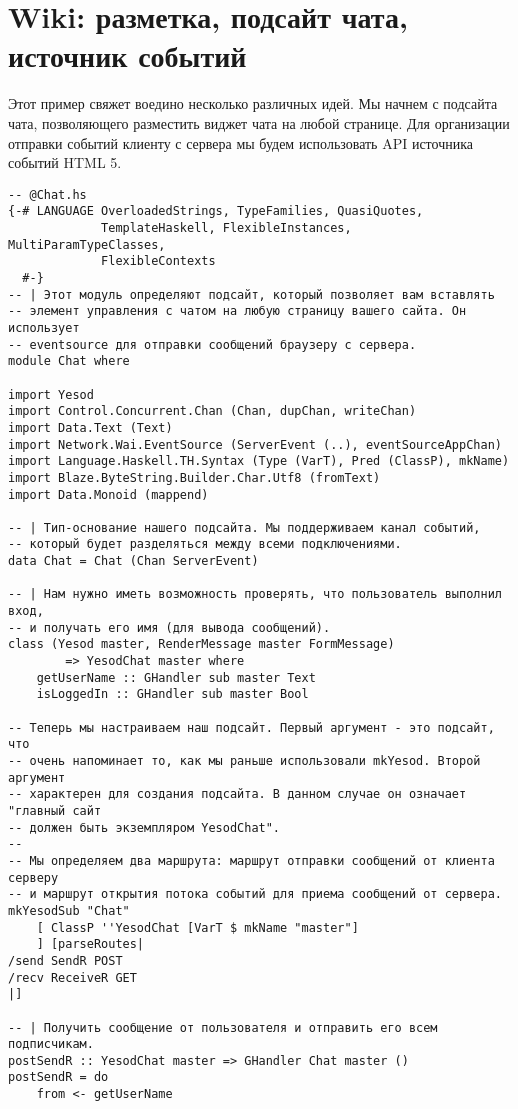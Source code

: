 
\chapter{Wiki: разметка, подсайт чата, источник событий}
\label{}

Этот пример свяжет воедино несколько различных идей. Мы начнем с подсайта чата, позволяющего разместить виджет чата на любой странице. Для организации отправки событий клиенту с сервера мы будем использовать API источника событий HTML 5.

\begin{lstlisting}
-- @Chat.hs
{-# LANGUAGE OverloadedStrings, TypeFamilies, QuasiQuotes,
             TemplateHaskell, FlexibleInstances, MultiParamTypeClasses,
             FlexibleContexts
  #-}
-- | Этот модуль определяют подсайт, который позволяет вам вставлять
-- элемент управления с чатом на любую страницу вашего сайта. Он использует
-- eventsource для отправки сообщений браузеру с сервера.
module Chat where

import Yesod
import Control.Concurrent.Chan (Chan, dupChan, writeChan)
import Data.Text (Text)
import Network.Wai.EventSource (ServerEvent (..), eventSourceAppChan)
import Language.Haskell.TH.Syntax (Type (VarT), Pred (ClassP), mkName)
import Blaze.ByteString.Builder.Char.Utf8 (fromText)
import Data.Monoid (mappend)

-- | Тип-основание нашего подсайта. Мы поддерживаем канал событий,
-- который будет разделяться между всеми подключениями.
data Chat = Chat (Chan ServerEvent)

-- | Нам нужно иметь возможность проверять, что пользователь выполнил вход,
-- и получать его имя (для вывода сообщений).
class (Yesod master, RenderMessage master FormMessage)
        => YesodChat master where
    getUserName :: GHandler sub master Text
    isLoggedIn :: GHandler sub master Bool

-- Теперь мы настраиваем наш подсайт. Первый аргумент - это подсайт, что
-- очень напоминает то, как мы раньше использовали mkYesod. Второй аргумент
-- характерен для создания подсайта. В данном случае он означает "главный сайт
-- должен быть экземпляром YesodChat".
--
-- Мы определяем два маршрута: маршрут отправки сообщений от клиента серверу
-- и маршрут открытия потока событий для приема сообщений от сервера.
mkYesodSub "Chat"
    [ ClassP ''YesodChat [VarT $ mkName "master"]
    ] [parseRoutes|
/send SendR POST
/recv ReceiveR GET
|]

-- | Получить сообщение от пользователя и отправить его всем подписчикам.
postSendR :: YesodChat master => GHandler Chat master ()
postSendR = do
    from <- getUserName


\end{lstlisting}
